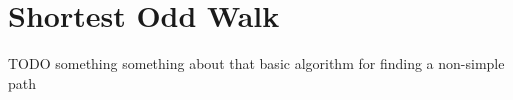 \chapter{Shortest Odd Walk}

TODO something something about that basic algorithm for finding a non-simple path
